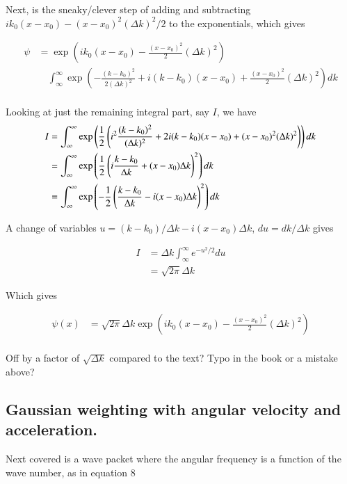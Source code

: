 \documentclass{article}
\begin{document}
Next, is the sneaky/clever step of adding and subtracting $i k_0 (x-x_0) - (x-x_0)^2 (\Delta k)^2/2$ to the exponentials, which gives

\begin{align*}
\psi 
&= 
\exp\left( i k_0 (x-x_0) - \frac{(x-x_0)^2}{2} (\Delta k)^2 \right) \\
&\quad \int_\infty^\infty 
\exp\left( 
- \frac{(k-k_0)^2}{2(\Delta k)^2} 
+i (k-k_0)(x-x_0) 
+\frac{(x-x_0)^2}{2} (\Delta k)^2 
\right) 
dk \\
\end{align*}

Looking at just the remaining integral part, say $I$, we have
\begin{align*}
I &= 
\int_\infty^\infty 
\exp\left( \frac{1}{2} \left(
i^2 \frac{(k-k_0)^2}{(\Delta k)^2} 
+2i (k-k_0)(x-x_0) 
+{(x-x_0)^2}{} (\Delta k)^2 
\right)
\right) 
dk \\
&= 
\int_\infty^\infty 
\exp\left( \frac{1}{2} \left(
i \frac{k-k_0}{\Delta k} 
+(x-x_0) \Delta k
\right)^2
\right) 
dk \\
&= 
\int_\infty^\infty 
\exp\left( -\frac{1}{2} \left(
\frac{k-k_0}{\Delta k} 
-i(x-x_0) \Delta k
\right)^2
\right) 
dk \\
\end{align*}

A change of variables $u = (k-k_0)/{\Delta k} -i(x-x_0) \Delta k$, $du = dk/{\Delta k}$ gives 

\begin{align*}
I 
&= \Delta k \int_\infty^\infty e^{ -u^2/2 } du \\
&= \sqrt{2 \pi} \Delta k 
\end{align*}

Which gives 

\begin{align*}
\psi(x) 
&= \sqrt{2 \pi} \Delta k 
\exp\left( i k_0 (x-x_0) - \frac{(x-x_0)^2}{2} (\Delta k)^2 \right) \\
\end{align*}

Off by a factor of $\sqrt{\Delta k}$ compared to the text?  Typo in the book or a mistake above?

\subsection{ Gaussian weighting with angular velocity and acceleration. }

Next covered is a wave packet where the angular frequency is a function of the wave number, as in equation 8
\end{document}
